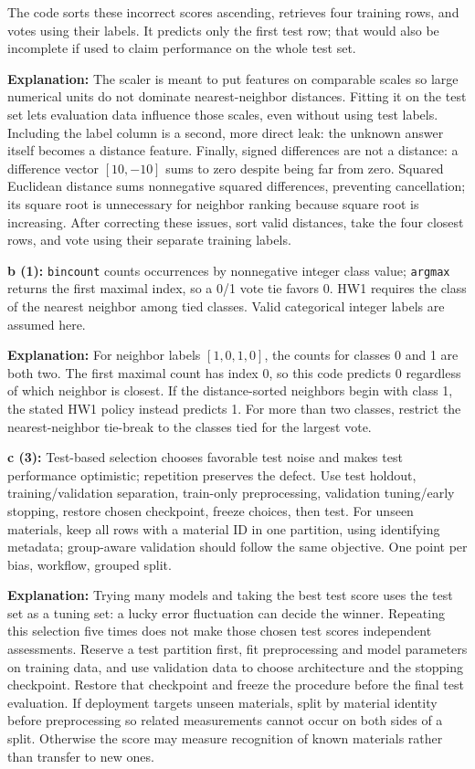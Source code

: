 \documentclass[11pt]{article}
\begin{document}
The code sorts these incorrect scores ascending, retrieves four training rows, and votes using their labels. It predicts only the first test row; that would also be incomplete if used to claim performance on the whole test set.

\textbf{Explanation:} The scaler is meant to put features on comparable scales so large numerical units do not dominate nearest-neighbor distances. Fitting it on the test set lets evaluation data influence those scales, even without using test labels. Including the label column is a second, more direct leak: the unknown answer itself becomes a distance feature. Finally, signed differences are not a distance: a difference vector $[10,-10]$ sums to zero despite being far from zero. Squared Euclidean distance sums nonnegative squared differences, preventing cancellation; its square root is unnecessary for neighbor ranking because square root is increasing. After correcting these issues, sort valid distances, take the four closest rows, and vote using their separate training labels.

\textbf{b (1):} \texttt{bincount} counts occurrences by nonnegative integer class value; \texttt{argmax} returns the first maximal index, so a 0/\allowbreak{}1 vote tie favors 0. HW1 requires the class of the nearest neighbor among tied classes. Valid categorical integer labels are assumed here.

\textbf{Explanation:} For neighbor labels $[1,0,1,0]$, the counts for classes 0 and 1 are both two. The first maximal count has index 0, so this code predicts 0 regardless of which neighbor is closest. If the distance-sorted neighbors begin with class 1, the stated HW1 policy instead predicts 1. For more than two classes, restrict the nearest-neighbor tie-break to the classes tied for the largest vote.

\textbf{c (3):} Test-based selection chooses favorable test noise and makes test performance optimistic; repetition preserves the defect. Use test holdout, training/\allowbreak{}validation separation, train-only preprocessing, validation tuning/\allowbreak{}early stopping, restore chosen checkpoint, freeze choices, then test. For unseen materials, keep all rows with a material ID in one partition, using identifying metadata; group-aware validation should follow the same objective. One point per bias, workflow, grouped split.

\textbf{Explanation:} Trying many models and taking the best test score uses the test set as a tuning set: a lucky error fluctuation can decide the winner. Repeating this selection five times does not make those chosen test scores independent assessments. Reserve a test partition first, fit preprocessing and model parameters on training data, and use validation data to choose architecture and the stopping checkpoint. Restore that checkpoint and freeze the procedure before the final test evaluation. If deployment targets unseen materials, split by material identity before preprocessing so related measurements cannot occur on both sides of a split. Otherwise the score may measure recognition of known materials rather than transfer to new ones.
\end{document}
